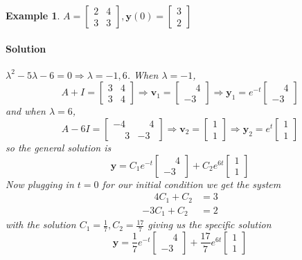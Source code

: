 \documentclass[letterpaper, 11pt, openany]{book}
\theoremstyle{mytheoremstyle}
\theoremstyle{myexamplestyle}
\newtheorem{example}{Example}[section]
\newenvironment{solution}{\paragraph{\sffamily \smaller \fontseries{b}\selectfont Solution}}{\hfill\faSquare}
\begin{document}
\begin{example}
    \(A = \begin{bmatrix} 2 & 4 \\ 3 & 3  \end{bmatrix}, \mathbf{y}(0) = \begin{bmatrix}
        3 \\ 2
    \end{bmatrix}\)
    \begin{solution}
        \(\lambda^{2} -5 \lambda - 6= 0 \Rightarrow \lambda = -1, 6\). When \(\lambda = -1\),
        \[A + I = \begin{bmatrix}3 & 4 \\ 3 & 4\end{bmatrix} \Rightarrow \mathbf{v}_{1} = \begin{bmatrix}
             \phantom{-}4 \\ -3
        \end{bmatrix} \Rightarrow \mathbf{y}_{1} = e^{-t} \begin{bmatrix}
             \phantom{-}4 \\ -3
        \end{bmatrix}\]
        and when \(\lambda = 6\),
        \[A - 6I = \begin{bmatrix}-4 &  \phantom{-}4 \\  \phantom{-}3 & -3\end{bmatrix} \Rightarrow \mathbf{v}_{2} = \begin{bmatrix}
             1 \\ 1
        \end{bmatrix} \Rightarrow \mathbf{y}_{2} = e^{t} \begin{bmatrix}
             1 \\ 1
        \end{bmatrix}\]
        so the general solution is
        \[\mathbf{y} = C_{1}e^{-t} \begin{bmatrix}\phantom{-}4 \\ -3\end{bmatrix} + C_{2}e^{6t} \begin{bmatrix}1 \\ 1\end{bmatrix}\]
        Now plugging in \(t=0\) for our initial condition we get the system
        \begin{align*}
             \phantom{-}4C_{1} + C_{2} &= 3\\
            -3C_{1} + C_{2} &= 2
        \end{align*}
        with the solution \(C_{1} = \frac{1}{7}, C_{2} = \frac{17}{7}\) giving us the specific solution
        \[\mathbf{y} = \frac{1}{7}e^{-t} \begin{bmatrix}\phantom{-}4 \\ -3\end{bmatrix} + \frac{17}{7}e^{6t} \begin{bmatrix}1 \\ 1\end{bmatrix}\]
    \end{solution}
\end{example}
\end{document}

